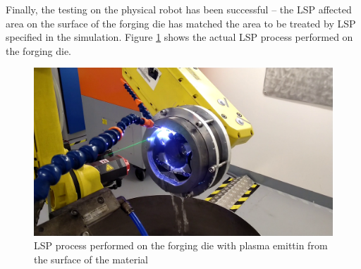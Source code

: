 Finally, the testing on the physical robot has been successful -- the LSP affected area on the surface of the forging die has matched the area to be treated by LSP specified in the simulation. Figure \ref{fig:peening} shows the actual LSP process performed on the forging die. 

\begin{figure}[h]
    \centering
    \includegraphics[width=0.9\linewidth]{img/peening_v2.png}
    \caption{LSP process performed on the forging die with plasma emittin from the surface of the material}
    \label{fig:peening}
\end{figure}



